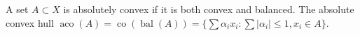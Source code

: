 A set $A \subset X$ is absolutely convex if it is both convex and balanced. The absolute convex hull $\operatorname{aco}(A) = \operatorname{co}(\operatorname{bal}(A)) = \{\sum \alpha_i x_i : \sum |\alpha_i| \leqslant 1, x_i \in A\}$.